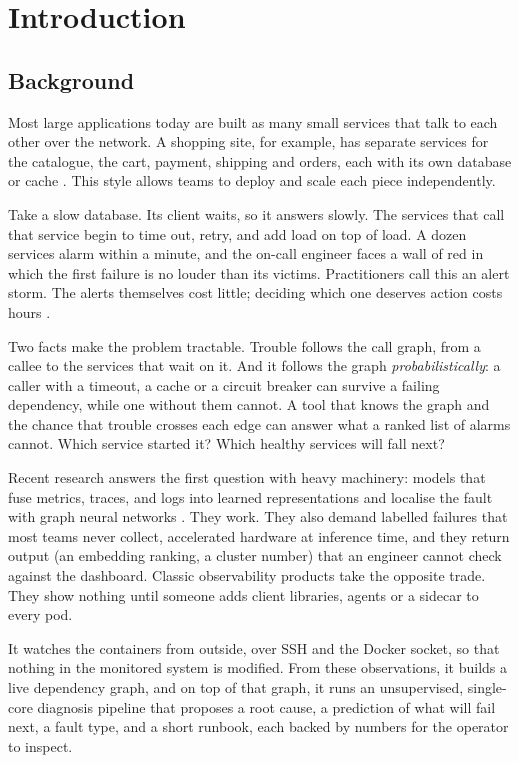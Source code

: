 \clearpage
\chapter[INTRODUCTION]{Introduction}
\label{ch:intro}

\section{Background}
Most large applications today are built as many small services that talk to each other over the network. A shopping site, for example, has separate services for the catalogue, the cart, payment, shipping and orders, each with its own database or cache \cite{dragoni2017microservices}. This style allows teams to deploy and scale each piece independently.

Take a slow database. Its client waits, so it answers slowly. The services that call that service begin to time out, retry, and add load on top of load. A dozen services alarm within a minute, and the on-call engineer faces a wall of red in which the first failure is no louder than its victims. Practitioners call this an alert storm. The alerts themselves cost little; deciding which one deserves action costs hours \cite{beyer2016sre,notaro2021survey}.

Two facts make the problem tractable. Trouble follows the call graph, from a callee to the services that wait on it. And it follows the graph \emph{probabilistically}: a caller with a timeout, a cache or a circuit breaker can survive a failing dependency, while one without them cannot. A tool that knows the graph and the chance that trouble crosses each edge can answer what a ranked list of alarms cannot. Which service started it? Which healthy services will fall next?

Recent research answers the first question with heavy machinery: models that fuse metrics, traces, and logs into learned representations and localise the fault with graph neural networks \cite{zhang2023diagfusion,sun2024deephunt,lee2023eadro}. They work. They also demand labelled failures that most teams never collect, accelerated hardware at inference time, and they return output (an embedding ranking, a cluster number) that an engineer cannot check against the dashboard. Classic observability products take the opposite trade. They show nothing until someone adds client libraries, agents or a sidecar to every pod.

It watches the containers from outside, over SSH and the Docker socket, so that nothing in the monitored system is modified. From these observations, it builds a live dependency graph, and on top of that graph, it runs an unsupervised, single-core diagnosis pipeline that proposes a root cause, a prediction of what will fail next, a fault type, and a short runbook, each backed by numbers for the operator to inspect.

